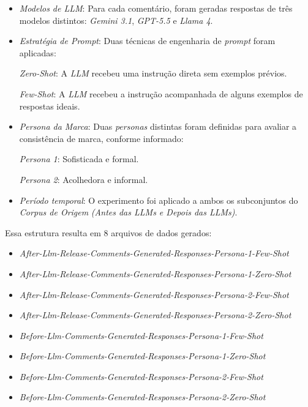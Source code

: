 \documentclass[12pt, a4paper]{article}
\numberwithin{equation}{section}
\begin{document}
\begin{itemize}
\item{\textit{Modelos de LLM}}: Para cada comentário, foram geradas respostas de três modelos distintos: \textit{Gemini 3.1}, \textit{GPT-5.5} e \textit{Llama 4}.

\item{\textit{Estratégia de Prompt}}: Duas técnicas de engenharia de \textit{prompt} foram aplicadas:

\subitem\textit{{Zero-Shot}}: A \textit{LLM} recebeu uma instrução direta sem exemplos prévios.

\subitem\textit{{Few-Shot}}: A \textit{LLM} recebeu a instrução acompanhada de alguns exemplos de respostas ideais.

\item\textit{{Persona da Marca}}: Duas \textit{personas} distintas foram definidas para avaliar a consistência de marca, conforme informado:

\subitem\textit{{Persona 1}}: Sofisticada e formal.

\subitem\textit{{Persona 2}}: Acolhedora e informal.

\item\textit{{Período temporal}}: O experimento foi aplicado a ambos os subconjuntos do \textit{Corpus de Origem} \textit{(Antes das LLMs e Depois das LLMs)}.
\end{itemize}

Essa estrutura resulta em 8 arquivos de dados gerados:
\begin{itemize}
\item\textit{After-Llm-Release-Comments-Generated-Responses-Persona-1-Few-Shot}

\item\textit{After-Llm-Release-Comments-Generated-Responses-Persona-1-Zero-Shot}

\item\textit{After-Llm-Release-Comments-Generated-Responses-Persona-2-Few-Shot}

\item\textit{After-Llm-Release-Comments-Generated-Responses-Persona-2-Zero-Shot}

\item\textit{Before-Llm-Comments-Generated-Responses-Persona-1-Few-Shot}

\item\textit{Before-Llm-Comments-Generated-Responses-Persona-1-Zero-Shot}

\item\textit{Before-Llm-Comments-Generated-Responses-Persona-2-Few-Shot}

\item\textit{Before-Llm-Comments-Generated-Responses-Persona-2-Zero-Shot}
\end{itemize}
\end{document}
